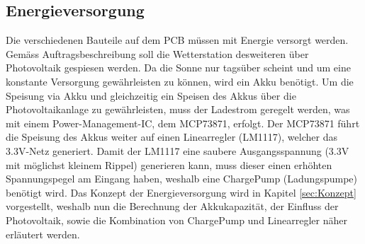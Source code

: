 \subsection{Energieversorgung}
\label{subsec:Energieversorgung}
Die verschiedenen Bauteile auf dem PCB müssen mit Energie versorgt werden. Gemäss Auftragsbeschreibung soll die Wetterstation desweiteren über Photovoltaik gespiesen werden. Da die Sonne nur tagsüber scheint und um eine konstante Versorgung gewährleisten zu können, wird ein Akku benötigt. Um die Speisung via Akku und gleichzeitig ein Speisen des Akkus über die Photovoltaikanlage zu gewährleisten, muss der Ladestrom geregelt werden, was mit einem Power-Management-IC, dem MCP73871, erfolgt. Der MCP73871 führt die Speisung des Akkus weiter auf einen Linearregler (LM1117), welcher das 3.3V-Netz generiert. Damit der LM1117 eine saubere Ausgangsspannung (3.3V mit möglichst kleinem Rippel) generieren kann, muss dieser einen erhöhten Spannungspegel am Eingang haben, weshalb eine ChargePump (Ladungspumpe) benötigt wird. Das Konzept der Energieversorgung wird in Kapitel \ref{sec:Konzept} vorgestellt, weshalb nun die Berechnung der Akkukapazität, der Einfluss der Photovoltaik, sowie die Kombination von ChargePump und Linearregler näher erläutert werden.

